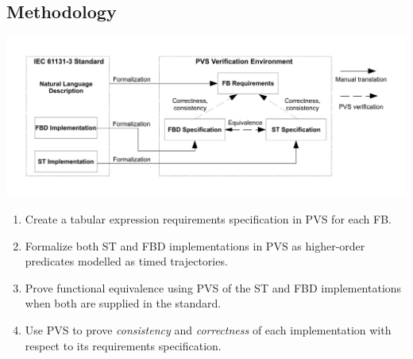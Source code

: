 \documentclass[a0,landscape]{a0poster}
\def\graphspacing{\vspace{.5cm}}
\newcommand{\capcolor}[1]{{\color{Black} #1}}
\begin{document}
\begin{multicols}{4}

{\color{Blue} \subsection*{Methodology}}

\begin{center}\graphspacing
\centering
\includegraphics[width=\linewidth]{figures/methodology}
\label{fig:framework}
\end{center}\graphspacing

\begin{enumerate} 
\item Create a tabular expression requirements specification in PVS for each FB.
\item Formalize both ST and FBD implementations in PVS as higher-order predicates modelled as timed trajectories. 
\item Prove functional equivalence using PVS of the ST and FBD implementations when both are supplied in the standard. 
\item Use PVS to prove {\color{BrickRed} \textit{consistency}} and {\color{BrickRed} \textit{correctness}} of each implementation with respect to its requirements specification.
\end{enumerate}




\end{multicols}
\end{document}
